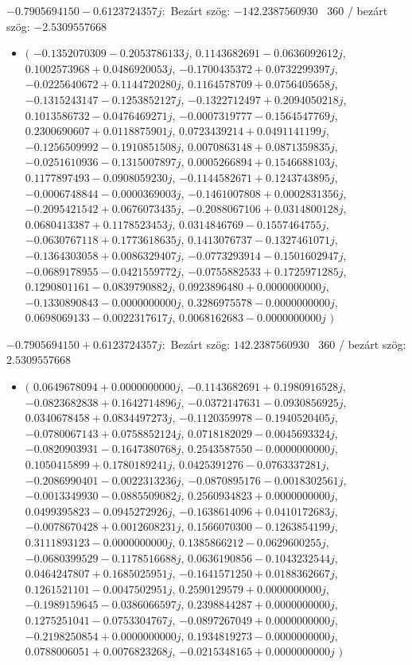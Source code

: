 \documentclass[14pt,a4paper]{article}
\begin{document}
$-0.7905694150-0.6123724357j$:\
Bezárt szög: $-142.2387560930$ \
360 / bezárt szög: $-2.5309557668$\
\begin{itemize}
\item
$\big($
$-0.1352070309-0.2053786133j$, $0.1143682691-0.0636092612j$, $0.1002573968+0.0486920053j$, $-0.1700435372+0.0732299397j$, $-0.0225640672+0.1144720280j$, $0.1164578709+0.0756405658j$, $-0.1315243147-0.1253852127j$, $-0.1322712497+0.2094050218j$, $0.1013586732-0.0476469271j$, $-0.0007319777-0.1564547769j$, $0.2300690607+0.0118875901j$, $0.0723439214+0.0491141199j$, $-0.1256509992-0.1910851508j$, $0.0070863148+0.0871359835j$, $-0.0251610936-0.1315007897j$, $0.0005266894+0.1546688103j$, $0.1177897493-0.0908059230j$, $-0.1144582671+0.1243743895j$, $-0.0006748844-0.0000369003j$, $-0.1461007808+0.0002831356j$, $-0.2095421542+0.0676073435j$, $-0.2088067106+0.0314800128j$, $0.0680413387+0.1178523453j$, $0.0314846769-0.1557464755j$, $-0.0630767118+0.1773618635j$, $0.1413076737-0.1327461071j$, $-0.1364303058+0.0086329407j$, $-0.0773293914-0.1501602947j$, $-0.0689178955-0.0421559772j$, $-0.0755882533+0.1725971285j$, $0.1290801161-0.0839790882j$, $0.0923896480+0.0000000000j$, $-0.1330890843-0.0000000000j$, $0.3286975578-0.0000000000j$, $0.0698069133-0.0022317617j$, $0.0068162683-0.0000000000j$
$\big)$
\end{itemize}
$-0.7905694150+0.6123724357j$:\
Bezárt szög: $142.2387560930$ \
360 / bezárt szög: $2.5309557668$\
\begin{itemize}
\item
$\big($
$0.0649678094+0.0000000000j$, $-0.1143682691+0.1980916528j$, $-0.0823682838+0.1642714896j$, $-0.0372147631-0.0930856925j$, $0.0340678458+0.0834497273j$, $-0.1120359978-0.1940520405j$, $-0.0780067143+0.0758852124j$, $0.0718182029-0.0045693324j$, $-0.0820903931-0.1647380768j$, $0.2543587550-0.0000000000j$, $0.1050415899+0.1780189241j$, $0.0425391276-0.0763337281j$, $-0.2086990401-0.0022313236j$, $-0.0870895176-0.0018302561j$, $-0.0013349930-0.0885509082j$, $0.2560934823+0.0000000000j$, $0.0499395823-0.0945272926j$, $-0.1638614096+0.0410172683j$, $-0.0078670428+0.0012608231j$, $0.1566070300-0.1263854199j$, $0.3111893123-0.0000000000j$, $0.1385866212-0.0629600255j$, $-0.0680399529-0.1178516688j$, $0.0636190856-0.1043232544j$, $0.0464247807+0.1685025951j$, $-0.1641571250+0.0188362667j$, $0.1261521101-0.0047502951j$, $0.2590129579+0.0000000000j$, $-0.1989159645-0.0386066597j$, $0.2398844287+0.0000000000j$, $0.1275251041-0.0753304767j$, $-0.0897267049+0.0000000000j$, $-0.2198250854+0.0000000000j$, $0.1934819273-0.0000000000j$, $0.0788006051+0.0076823268j$, $-0.0215348165+0.0000000000j$
$\big)$
\end{itemize}
\end{document}
